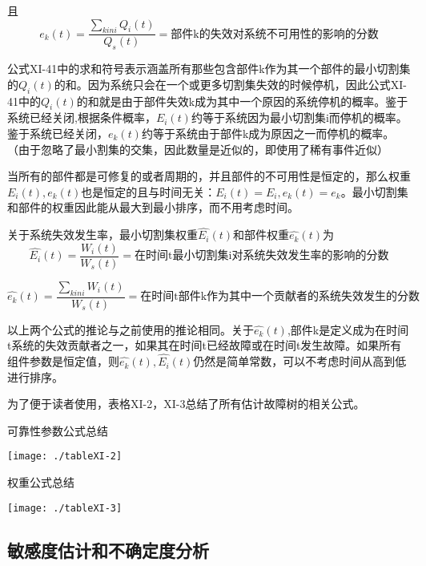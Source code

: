 \documentclass[cn,11pt,chinese]{elegantbook}
\begin{document}
{且
\begin{equation}\label{key}
e_k(t)=\frac{\sum_{k in i}Q_i(t)}{Q_s(t)}= \mbox{部件k的失效对系统不可用性的影响的分数}
\end{equation}



公式XI-41中的求和符号表示涵盖所有那些包含部件k作为其一个部件的最小切割集的$Q_i(t)$的和。因为系统只会在一个或更多切割集失效的时候停机，因此公式XI-41中的$Q_i(t)$的和就是由于部件失效k成为其中一个原因的系统停机的概率。鉴于系统已经关闭,根据条件概率，$E_i(t)$约等于系统因为最小切割集i而停机的概率。鉴于系统已经关闭，$e_k(t)$约等于系统由于部件k成为原因之一而停机的概率。（由于忽略了最小割集的交集，因此数量是近似的，即使用了稀有事件近似）

当所有的部件都是可修复的或者周期的，并且部件的不可用性是恒定的，那么权重$E_i(t),e_k(t)$也是恒定的且与时间无关：$E_i(t)=E_i,e_k(t)=e_k$。最小切割集和部件的权重因此能从最大到最小排序，而不用考虑时间。

关于系统失效发生率，最小切割集权重$\hat{E_i}(t)$和部件权重$\hat{e_k}(t)$为
\begin{equation}\label{eq11-44}
\hat{E_i}(t)=\frac{W_i(t)}{W_s(t)} = \mbox{在时间t最小切割集i对系统失效发生率的影响的分数}
\end{equation}

\begin{equation}\label{eq11-46}
\hat{e_k}(t)=\frac{\sum_{k in i}W_i(t)}{W_s(t)} = \mbox{在时间t部件k作为其中一个贡献者的系统失效发生的分数}
\end{equation}



以上两个公式的推论与之前使用的推论相同。关于$\hat{e_k}(t)$,部件k是定义成为在时间t系统的失效贡献者之一，如果其在时间t已经故障或在时间t发生故障。如果所有组件参数是恒定值，则$\hat{e_k}(t),\hat{E_i}(t)$仍然是简单常数，可以不考虑时间从高到低进行排序。

为了便于读者使用，表格XI-2，XI-3总结了所有估计故障树的相关公式。

\begin{table}
	\centering
	\caption{可靠性参数公式总结}
	\label{tb11-2}
	\texttt{[image: ./tableXI-2]}
\end{table}

\begin{table}
	\centering
	\caption{权重公式总结}
	\label{tb11-3}
	\texttt{[image: ./tableXI-3]}
\end{table}

\subsection{敏感度估计和不确定度分析}

}
\end{document}
